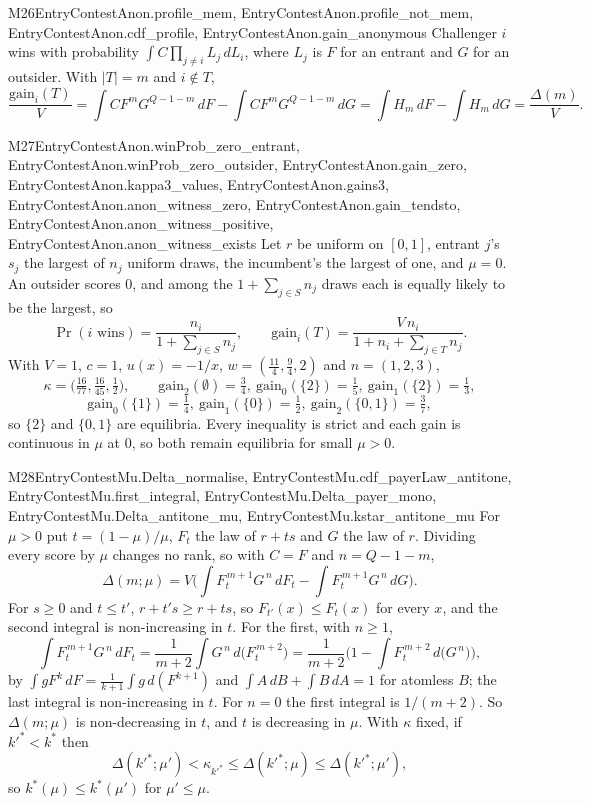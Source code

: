 \begin{mproof}{M26}{EntryContestAnon.profile_mem, EntryContestAnon.profile_not_mem, EntryContestAnon.cdf_profile, EntryContestAnon.gain_anonymous}
Challenger $i$ wins with probability $\int C\prod_{j\ne i}L_j\,dL_i$, where $L_j$ is
$F$ for an entrant and $G$ for an outsider. With $|T|=m$ and $i\notin T$,
\[
  \frac{\mathrm{gain}_i(T)}V=\int CF^mG^{Q-1-m}\,dF-\int CF^mG^{Q-1-m}\,dG
  =\int H_m\,dF-\int H_m\,dG=\frac{\Delta(m)}V .
\]
\end{mproof}

\begin{mproof}{M27}{EntryContestAnon.winProb_zero_entrant, EntryContestAnon.winProb_zero_outsider, EntryContestAnon.gain_zero, EntryContestAnon.kappa3_values, EntryContestAnon.gains3, EntryContestAnon.anon_witness_zero, EntryContestAnon.gain_tendsto, EntryContestAnon.anon_witness_positive, EntryContestAnon.anon_witness_exists}
Let $r$ be uniform on $[0,1]$, entrant $j$'s $s_j$ the largest of $n_j$ uniform
draws, the incumbent's the largest of one, and $\mu=0$. An outsider scores $0$, and among the
$1+\sum_{j\in S}n_j$ draws each is equally likely to be the largest, so
\[
  \Pr(i\text{ wins})=\frac{n_i}{1+\sum_{j\in S}n_j},\qquad
  \mathrm{gain}_i(T)=\frac{V\,n_i}{1+n_i+\sum_{j\in T}n_j}.
\]
With $V=1$, $c=1$, $u(x)=-1/x$, $w=(\frac{11}4,\frac94,2)$ and $n=(1,2,3)$,
\[
  \kappa=\big(\tfrac{16}{77},\tfrac{16}{45},\tfrac12\big),\qquad
  \mathrm{gain}_2(\emptyset)=\tfrac34,\ \mathrm{gain}_0(\{2\})=\tfrac15,\
  \mathrm{gain}_1(\{2\})=\tfrac13,
\]
\[
  \mathrm{gain}_0(\{1\})=\tfrac14,\ \mathrm{gain}_1(\{0\})=\tfrac12,\
  \mathrm{gain}_2(\{0,1\})=\tfrac37,
\]
so $\{2\}$ and $\{0,1\}$ are equilibria. Every inequality is strict and each
gain is continuous in $\mu$ at $0$, so both remain equilibria for small $\mu>0$.
\end{mproof}

\begin{mproof}{M28}{EntryContestMu.Delta_normalise, EntryContestMu.cdf_payerLaw_antitone, EntryContestMu.first_integral, EntryContestMu.Delta_payer_mono, EntryContestMu.Delta_antitone_mu, EntryContestMu.kstar_antitone_mu}
For $\mu>0$ put $t=(1-\mu)/\mu$, $F_t$ the law of $r+ts$ and $G$ the law of
$r$. Dividing every score by $\mu$ changes no rank, so with $C=F$ and
$n=Q-1-m$,
\[
  \Delta(m;\mu)=V\Big(\int F_t^{\,m+1}G^{\,n}\,dF_t-\int F_t^{\,m+1}G^{\,n}\,dG\Big).
\]
For $s\ge0$ and $t\le t'$, $r+t's\ge r+ts$, so $F_{t'}(x)\le F_t(x)$ for every
$x$, and the second integral is non-increasing in $t$. For the first, with
$n\ge1$,
\[
  \int F_t^{\,m+1}G^{\,n}\,dF_t=\frac1{m+2}\int G^{\,n}\,d\big(F_t^{\,m+2}\big)
  =\frac1{m+2}\Big(1-\int F_t^{\,m+2}\,d\big(G^{\,n}\big)\Big),
\]
by $\int gF^{k}\,dF=\frac1{k+1}\int g\,d(F^{k+1})$ and
$\int A\,dB+\int B\,dA=1$ for atomless $B$; the last integral is
non-increasing in $t$. For $n=0$ the first integral is $1/(m+2)$. So
$\Delta(m;\mu)$ is non-decreasing in $t$, and $t$ is decreasing in $\mu$.
With $\kappa$ fixed, if $k'^*<k^*$ then
\[
  \Delta(k'^*;\mu')<\kappa_{k'^*}\le\Delta(k'^*;\mu)\le\Delta(k'^*;\mu'),
\]
so $k^*(\mu)\le k^*(\mu')$ for $\mu'\le\mu$.
\end{mproof}

